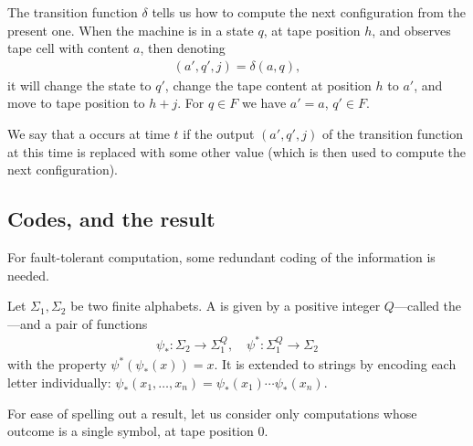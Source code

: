 \documentclass[12pt]{memoir}
\newcommand{\h}{h}
\begin{document}
    The transition function $\delta$ tells us how to compute the next
    configuration from the present one.
    When the machine is in a state $q$, at tape position $\h$, and
    observes tape cell with content $a$, then denoting
         \begin{align*}
           (a',q',j)=\delta(a,q),
         \end{align*}
    it will change the state to $q'$, change the
    tape content at position \( \h \) to $a'$, and move to tape position to $\h+j$.
    For $q\in F$ we have $a'=a$, $q'\in F$.


\begin{definition}[Fault]\label{def:fault}
    We say that a  occurs at time $t$ if the output $(a',q',j)$ of the
    transition function at this time is replaced with some other value
    (which is then used to compute the next configuration).
\end{definition}


\subsection{Codes, and the result}

For fault-tolerant computation, some redundant coding of the information is needed.

\begin{definition}[Codes]\label{def:codes}
    Let $\Sigma_{1},\Sigma_{2}$ be two finite alphabets.
    A  is given by a positive integer $Q$---called
    the ---and a pair of functions
    \begin{align*}
            \psi_{*} :\Sigma_{2}\to\Sigma_{1}^{Q},
            \quad
            \psi^{*}:\Sigma_{1}^{Q}\to\Sigma_{2}
    \end{align*}
    with the property $\psi^{*}(\psi_{*}(x))=x$.
It is extended to strings by encoding each letter individually:
\( \psi_{*}(x_{1},\dots,x_{n})=\psi_{*}(x_{1})\dotsm\psi_{*}(x_{n}) \).
\end{definition}

For ease of spelling out a result, let us consider only computations whose outcome
is a single symbol, at tape position 0.
\end{document}
